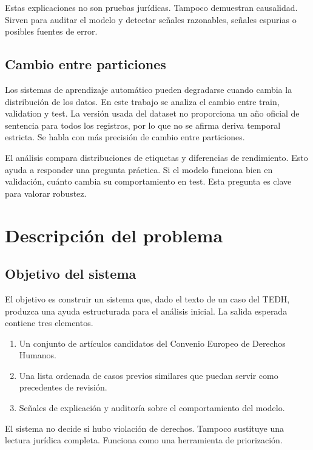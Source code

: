 \documentclass[11pt,a4paper]{article}
\begin{document}
Estas explicaciones no son pruebas jurídicas. Tampoco demuestran causalidad. Sirven para auditar el modelo y detectar señales razonables, señales espurias o posibles fuentes de error.

\subsection{Cambio entre particiones}

Los sistemas de aprendizaje automático pueden degradarse cuando cambia la distribución de los datos. En este trabajo se analiza el cambio entre train, validation y test. La versión usada del dataset no proporciona un año oficial de sentencia para todos los registros, por lo que no se afirma deriva temporal estricta. Se habla con más precisión de cambio entre particiones.

El análisis compara distribuciones de etiquetas y diferencias de rendimiento. Esto ayuda a responder una pregunta práctica. Si el modelo funciona bien en validación, cuánto cambia su comportamiento en test. Esta pregunta es clave para valorar robustez.

\section{Descripción del problema}
\label{sec_problema}

\subsection{Objetivo del sistema}

El objetivo es construir un sistema que, dado el texto de un caso del TEDH, produzca una ayuda estructurada para el análisis inicial. La salida esperada contiene tres elementos.

\begin{enumerate}[label=\arabic*.]
    \item Un conjunto de artículos candidatos del Convenio Europeo de Derechos Humanos.
    \item Una lista ordenada de casos previos similares que puedan servir como precedentes de revisión.
    \item Señales de explicación y auditoría sobre el comportamiento del modelo.
\end{enumerate}

El sistema no decide si hubo violación de derechos. Tampoco sustituye una lectura jurídica completa. Funciona como una herramienta de priorización.
\end{document}
